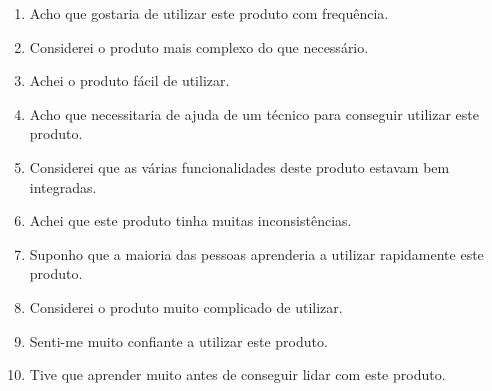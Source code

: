 \begin{enumerate}
    \item Acho que gostaria de utilizar este produto com frequência.
    \item Considerei o produto mais complexo do que necessário.
    \item Achei o produto fácil de utilizar.
    \item Acho que necessitaria de ajuda de um técnico para conseguir utilizar este produto.
    \item Considerei que as várias funcionalidades deste produto estavam bem integradas.
    \item Achei que este produto tinha muitas inconsistências.
    \item Suponho que a maioria das pessoas aprenderia a utilizar rapidamente este produto.
    \item Considerei o produto muito complicado de utilizar.
    \item Senti-me muito confiante a utilizar este produto.
    \item Tive que aprender muito antes de conseguir lidar com este produto.
\end{enumerate}
